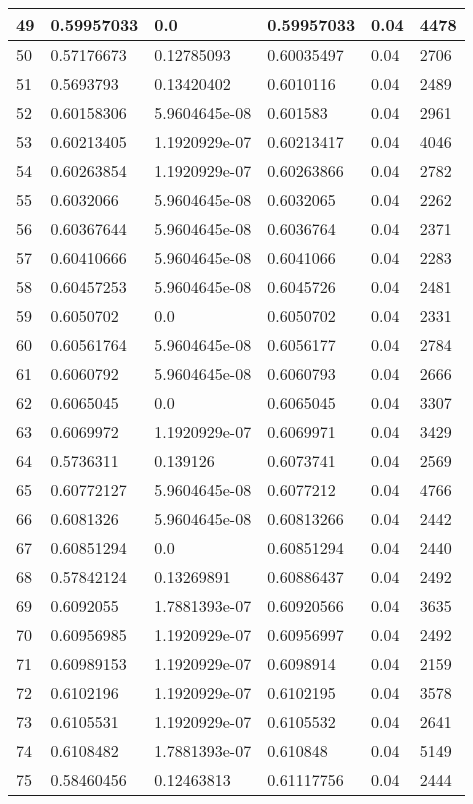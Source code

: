 \begin{longtable}{|l|l|l|l|l|l|}
49 & 0.59957033 & 0.0 & 0.59957033 & 0.04 & 4478 \\ \hline 
50 & 0.57176673 & 0.12785093 & 0.60035497 & 0.04 & 2706 \\ \hline 
51 & 0.5693793 & 0.13420402 & 0.6010116 & 0.04 & 2489 \\ \hline 
52 & 0.60158306 & 5.9604645e-08 & 0.601583 & 0.04 & 2961 \\ \hline 
53 & 0.60213405 & 1.1920929e-07 & 0.60213417 & 0.04 & 4046 \\ \hline 
54 & 0.60263854 & 1.1920929e-07 & 0.60263866 & 0.04 & 2782 \\ \hline 
55 & 0.6032066 & 5.9604645e-08 & 0.6032065 & 0.04 & 2262 \\ \hline 
56 & 0.60367644 & 5.9604645e-08 & 0.6036764 & 0.04 & 2371 \\ \hline 
57 & 0.60410666 & 5.9604645e-08 & 0.6041066 & 0.04 & 2283 \\ \hline 
58 & 0.60457253 & 5.9604645e-08 & 0.6045726 & 0.04 & 2481 \\ \hline 
59 & 0.6050702 & 0.0 & 0.6050702 & 0.04 & 2331 \\ \hline 
60 & 0.60561764 & 5.9604645e-08 & 0.6056177 & 0.04 & 2784 \\ \hline 
61 & 0.6060792 & 5.9604645e-08 & 0.6060793 & 0.04 & 2666 \\ \hline 
62 & 0.6065045 & 0.0 & 0.6065045 & 0.04 & 3307 \\ \hline 
63 & 0.6069972 & 1.1920929e-07 & 0.6069971 & 0.04 & 3429 \\ \hline 
64 & 0.5736311 & 0.139126 & 0.6073741 & 0.04 & 2569 \\ \hline 
65 & 0.60772127 & 5.9604645e-08 & 0.6077212 & 0.04 & 4766 \\ \hline 
66 & 0.6081326 & 5.9604645e-08 & 0.60813266 & 0.04 & 2442 \\ \hline 
67 & 0.60851294 & 0.0 & 0.60851294 & 0.04 & 2440 \\ \hline 
68 & 0.57842124 & 0.13269891 & 0.60886437 & 0.04 & 2492 \\ \hline 
69 & 0.6092055 & 1.7881393e-07 & 0.60920566 & 0.04 & 3635 \\ \hline 
70 & 0.60956985 & 1.1920929e-07 & 0.60956997 & 0.04 & 2492 \\ \hline 
71 & 0.60989153 & 1.1920929e-07 & 0.6098914 & 0.04 & 2159 \\ \hline 
72 & 0.6102196 & 1.1920929e-07 & 0.6102195 & 0.04 & 3578 \\ \hline 
73 & 0.6105531 & 1.1920929e-07 & 0.6105532 & 0.04 & 2641 \\ \hline 
74 & 0.6108482 & 1.7881393e-07 & 0.610848 & 0.04 & 5149 \\ \hline 
75 & 0.58460456 & 0.12463813 & 0.61117756 & 0.04 & 2444 \\ \hline 
\end{longtable}